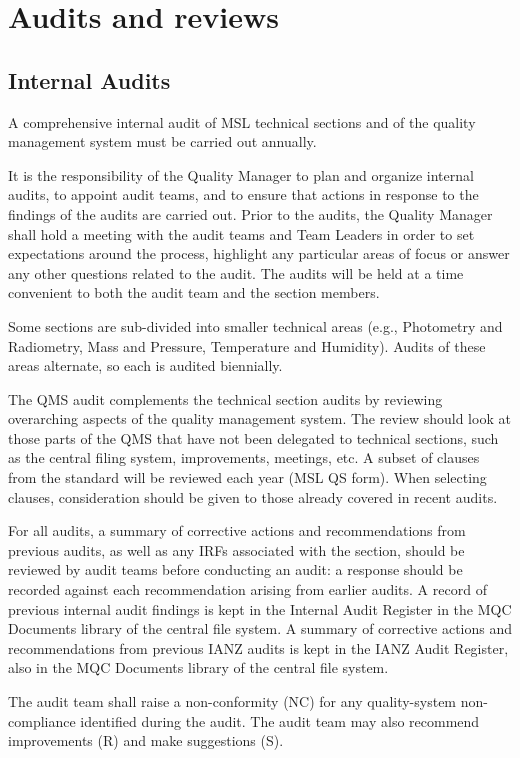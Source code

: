 \section{Audits and reviews}
\subsection{Internal Audits}
\label{ss:internal_audit}
A comprehensive internal audit of MSL technical sections and of the quality management system must be carried out annually. 

It is the responsibility of the Quality Manager to plan and organize internal audits, to appoint audit teams, and to ensure that actions in response to the findings of the audits are carried out. Prior to the audits, the Quality Manager shall hold a meeting with the audit teams and Team Leaders in order to set expectations around the process, highlight any particular areas of focus or answer any other questions related to the audit. The audits will be held at a time convenient to both the audit team and the section members. 

Some sections are sub-divided into smaller technical areas (e.g., Photometry and Radiometry, Mass and Pressure, Temperature and Humidity). Audits of these areas alternate, so each is audited biennially.

The QMS audit complements the technical section audits by reviewing overarching aspects of the quality management system. The review should look at those parts of the QMS that have not been delegated to technical sections, such as the central filing system, improvements, meetings, etc. A subset of clauses from the standard will be reviewed each year (MSL QS form). When selecting clauses, consideration should be given to those already covered in recent audits. 

For all audits, a summary of corrective actions and recommendations from previous audits, as well as any IRFs associated with the section, should be reviewed by audit teams before conducting an audit: a response should be recorded against each recommendation arising from earlier audits. A record of previous internal audit findings is kept in the Internal Audit Register in the MQC Documents library of the central file system. A summary of corrective actions and recommendations from previous IANZ audits is kept in the IANZ Audit Register, also in the MQC Documents library of the central file system. 

The audit team shall raise a non-conformity (NC) for any quality-system non-compliance identified during the audit. The audit team may also recommend improvements (R) and make suggestions (S). 

